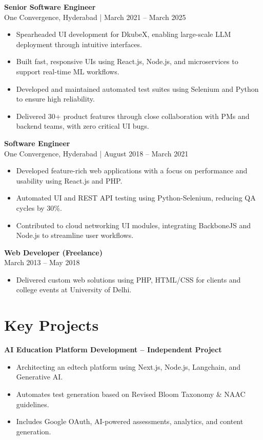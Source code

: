 \documentclass[11pt, a4paper]{article}
\newcommand{\smallgray}[1]{\textcolor{darkgray!90}{\small #1}}
\begin{document}
\textbf{Senior Software Engineer} \\
\smallgray{One Convergence, Hyderabad | March 2021 -- March 2025}
\begin{itemize}
    \item Spearheaded UI development for DkubeX, enabling large-scale LLM deployment through intuitive interfaces.
    \item Built fast, responsive UIs using React.js, Node.js, and microservices to support real-time ML workflows.
    \item Developed and maintained automated test suites using Selenium and Python to ensure high reliability.
    \item Delivered 30+ product features through close collaboration with PMs and backend teams, with zero critical UI bugs.
\end{itemize}

\textbf{Software Engineer} \\
\smallgray{One Convergence, Hyderabad | August 2018 -- March 2021}
\begin{itemize}
    \item Developed feature-rich web applications with a focus on performance and usability using React.js and PHP.
    \item Automated UI and REST API testing using Python-Selenium, reducing QA cycles by 30\%.
    \item Contributed to cloud networking UI modules, integrating BackboneJS and Node.js to streamline user workflows.
\end{itemize}

\textbf{Web Developer (Freelance)} \\
March 2013 -- May 2018
\begin{itemize}
    \item Delivered custom web solutions using PHP, HTML/CSS for clients and college events at University of Delhi.
\end{itemize}


\section{Key Projects}
\textbf{AI Education Platform Development -- Independent Project}
\begin{itemize}
    \item Architecting an edtech platform using Next.js, Node.js, Langchain, and Generative AI.
    \item Automates test generation based on Revised Bloom Taxonomy \& NAAC guidelines.
    \item Includes Google OAuth, AI-powered assessments, analytics, and content generation. \\
\end{itemize}
\end{document}
